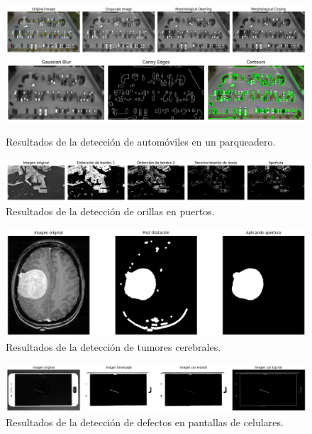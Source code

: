 \begin{figure}[t]
    \centering
    \includegraphics[height=0.15\textwidth]{./figures/drive/parqueadero.png}
    \includegraphics[height=0.15\textwidth]{./figures/drive/parqueadero_2.png}
    \caption{Resultados de la detección de automóviles en un parqueadero.}
    \label{fig:parqueadero_results}
\end{figure}

\begin{figure}[t]
    \centering
    \includegraphics[height=0.3\textwidth]{./figures/drive/puerto.png}
    \caption{Resultados de la detección de orillas en puertos.}
    \label{fig:puerto_results}
\end{figure}

\begin{figure}[t]
    \centering
    \includegraphics[height=0.30\textwidth]{./figures/drive/tumor.png}
    \caption{Resultados de la detección de tumores cerebrales.}
    \label{fig:tumor_results}
\end{figure}

\begin{figure}[t]
    \centering
    \includegraphics[height=0.3\textwidth]{./figures/drive/celulares.png}
    \caption{Resultados de la detección de defectos en pantallas de celulares.}
    \label{fig:celular_results}
\end{figure}

